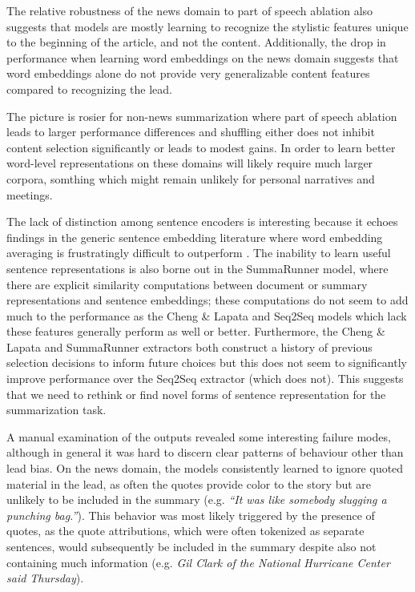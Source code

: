     The relative robustness of the news domain to part of speech ablation also 
    suggests that models are mostly learning to recognize the stylistic 
    features unique to the beginning of the article, and not the content.
    Additionally, the drop in performance when learning word embeddings on 
    the news domain suggests that word embeddings alone do not provide 
    very generalizable content features compared to recognizing the lead.

The picture is rosier for non-news summarization where part of speech ablation leads
to larger performance differences and shuffling either does not inhibit content
selection significantly or leads to modest gains. In order to learn better
word-level representations on these domains will likely require much
larger corpora, somthing which might remain unlikely for personal narratives
and meetings.



The lack of distinction among sentence encoders is interesting because 
it echoes findings in the generic sentence embedding literature 
where word embedding averaging is frustratingly difficult to 
outperform  \cite{wieting2015towards,arora2016simple,wieting2017revisiting}. 
The inability to learn useful sentence representations is also 
borne out in the 
SummaRunner model, where there are explicit similarity computations
between document or summary representations and sentence embeddings;
these computations do not seem to add much to the performance as the 
Cheng \& Lapata and Seq2Seq models which lack these features generally
perform as well or better.
Furthermore, the Cheng \& Lapata and SummaRunner extractors both construct
a history of previous selection decisions to inform future choices but this
does not seem to significantly improve performance over the Seq2Seq extractor 
(which does not). This suggests that we need to rethink or find novel forms 
of sentence representation for the summarization task.


A manual examination of the outputs revealed some interesting failure modes,
although in general it was hard to discern clear patterns of behaviour 
other than lead bias. On the news domain, the models consistently learned 
to ignore quoted material in the lead, as often the quotes provide
color to the story but are unlikely to be included in the summary (e.g. \textit{``It was like somebody slugging a punching bag.''}). 
This behavior was most likely triggered by the presence of quotes, as the
quote attributions, which were often tokenized as separate sentences,
would subsequently be included in the summary despite also not containing 
much information 
(e.g. \textit{Gil Clark of the National Hurricane Center said Thursday}). 




